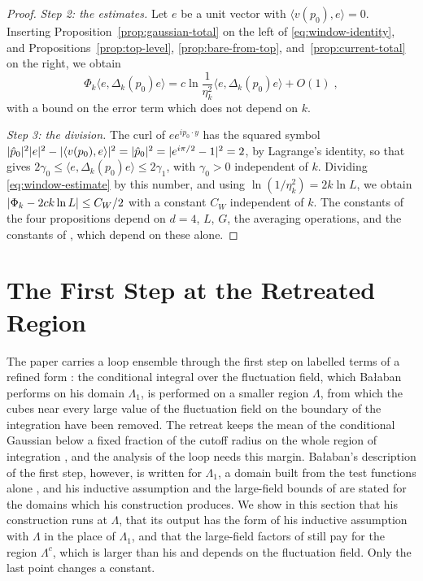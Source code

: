 \documentclass[11pt]{preprint}
\DeclarePairedDelimiter{\abs}{\lvert}{\rvert}
\numberwithin{equation}{section}
\theoremstyle{definition}
\theoremstyle{remark}
\theoremstyle{plain}
\begin{document}
\begin{proof}
\emph{Step 2: the estimates.} Let $e$ be a unit vector with $\langle v(p_0), e \rangle = 0$. Inserting Proposition~\ref{prop:gaussian-total} on the left of \eqref{eq:window-identity}, and Propositions~\ref{prop:top-level}, \ref{prop:bare-from-top}, and~\ref{prop:current-total} on the right, we obtain
\begin{equation}\label{eq:window-estimate}
    \Phi_k\langle e, \Delta_k(p_0)e \rangle = c\ln\frac{1}{\eta_k^2}\langle e, \Delta_k(p_0)e \rangle + O(1)\;,
\end{equation}
with a bound on the error term which does not depend on $k$.

\emph{Step 3: the division.} The curl of $ee^{ip_0\cdot y}$ has the squared symbol $\abs{\hat p_0}^2\abs{e}^2 - \abs{\langle v(p_0), e \rangle}^2 = \abs{\hat p_0}^2 = \abs{e^{i\pi/2} - 1}^2 = 2$, by Lagrange's identity, so that \cite[(1.67), p.~29]{BalabanPRT1} gives $2\gamma_0 \leq \langle e, \Delta_k(p_0)e \rangle \leq 2\gamma_1$, with $\gamma_0 > 0$ independent of $k$. Dividing \eqref{eq:window-estimate} by this number, and using $\ln(1/\eta_k^2) = 2k\ln L$, we obtain $\abs{\Phi_k - 2ck\ln L} \leq C_W/2$ with a constant $C_W$ independent of $k$. The constants of the four propositions depend on $d = 4$, $L$, $G$, the averaging operations, and the constants of \cite{BalabanPRT1,BalabanPBG,BalabanVAR}, which depend on these alone.
\end{proof}

\section{The First Step at the Retreated Region}\label{sec:retreated-region}

The paper carries a loop ensemble through the first step on labelled terms of a refined form \cite[Section~9.4]{WilsonFirstStep}: the conditional integral over the fluctuation field, which Ba{\l}aban performs on his domain $\Lambda_1$, is performed on a smaller region $\Lambda$, from which the cubes near every large value of the fluctuation field on the boundary of the integration have been removed. The retreat keeps the mean of the conditional Gaussian below a fixed fraction of the cutoff radius on the whole region of integration \cite[Remark~9.11]{WilsonFirstStep}, and the analysis of the loop needs this margin. Ba{\l}aban's description of the first step, however, is written for $\Lambda_1$, a domain built from the test functions alone \cite[(1.20), p.~251]{BalabanCRE}, and his inductive assumption and the large-field bounds of \cite[Section~1]{BalabanLFR2} are stated for the domains which his construction produces. We show in this section that his construction runs at $\Lambda$, that its output has the form of his inductive assumption with $\Lambda$ in the place of $\Lambda_1$, and that the large-field factors of \cite{BalabanLFR2} still pay for the region $\Lambda^c$, which is larger than his and depends on the fluctuation field. Only the last point changes a constant.
\end{document}
